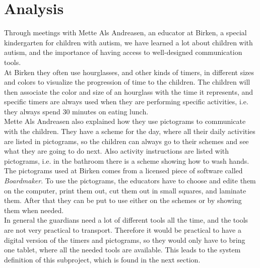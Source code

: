 \chapter{Analysis}
Through meetings with Mette Als Andreasen, an educator at Birken, a special kindergarten for children with autism, we have learned a lot about children with autism, and the importance of having access to well-designed communication tools.\\

At Birken they often use hourglasses, and other kinds of timers, in different sizes and colors to visualize the progression of time to the children. The children will then associate the color and size of an hourglass with the time it represents, and specific timers are always used when they are performing specific activities, i.e. they always spend 30 minutes on eating lunch.\\
Mette Als Andreasen also explained how they use pictograms to communicate with the children. They have a scheme for the day, where all their daily activities are listed in pictograms, so the children can always go to their schemes and see what they are going to do next. Also activity instructions are listed with pictograms, i.e. in the bathroom there is a scheme showing how to wash hands.\\
The pictograms used at Birken comes from a licensed piece of software called \textit{Boardmaker}\cite{web:boardmaker}. To use the pictograms, the educators have to choose and edite them on the computer, print them out, cut them out in small squares, and laminate them. After that they can be put to use either on the schemes or by showing them when needed.\\

In general the guardians need a lot of different tools all the time, and the tools are not very practical to transport. Therefore it would be practical to have a digital version of the timers and pictograms, so they would only have to bring one tablet, where all the needed tools are available. This leads to the system definition of this subproject, which is found in the next section.